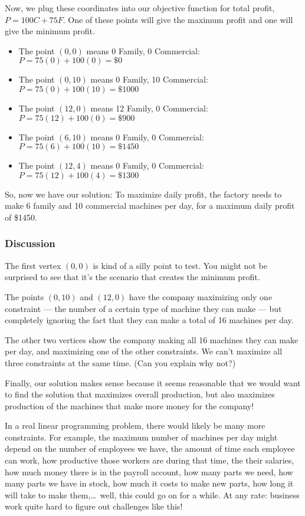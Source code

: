 Now, we plug these coordinates into our objective function for total profit, $P = 100C + 75F$. One of these points will give the maximum profit and one will give the minimum profit.
\begin{itemize}
\item The point $(0,0)$ means 0 Family, 0 Commercial: $P = 75(0) + 100(0) = \$0$

\item The point $(0,10)$ means 0 Family, 10 Commercial: $P = 75(0) + 100(10) = \$1000$

\item The point $(12,0)$ means 12 Family, 0 Commercial: $P = 75(12) + 100(0) = \$900$

\item The point $(6,10)$ means 0 Family, 0 Commercial: $P = 75(6) + 100(10) = \$1450$

\item The point $(12,4)$ means 0 Family, 0 Commercial: $P = 75(12) + 100(4) = \$1300$
\end{itemize}
So, now we have our solution: To maximize daily profit, the factory needs to make 6 family and 10 commercial machines per day, for a maximum daily profit of \$1450.

 \subsubsection{Discussion}

The first vertex $(0,0)$ is kind of a silly point to test. You might not be surprised to see that it's the scenario that creates the minimum profit.

The points $(0, 10)$ and $(12, 0)$ have the company maximizing only one constraint --- the number of a certain type of machine they can make --- but completely ignoring the fact that they can make a total of 16 machines per day.

The other two vertices show the company making all 16 machines they can make per day, and maximizing one of the other constraints. We can't maximize all three constraints at the same time. (Can you explain why not?)

Finally, our solution makes sense because it seems reasonable that we would want to find the solution that maximizes overall production, but also maximizes production of the machines that make more money for the company!

In a real linear programming problem, there would likely be many more constraints. For example, the maximum number of machines per day might depend on the number of employees we have, the amount of time each employee can work, how productive those workers are during that time, the their salaries, how much money there is in the payroll account, how many parts we need, how many parts we have in stock, how much it costs to make new parts, how long it will take to make them,\ldots\ well, this could go on for a while. At any rate: business work quite hard to figure out challenges like this!



